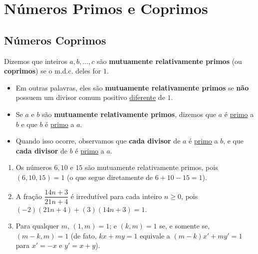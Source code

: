 \section{Números Primos e Coprimos}

    \subsection{Números Coprimos}

        \begin{definicao}[ 5.1. : ]
            Dizemos que inteiros $a, b, \ldots, c$ são \textbf{mutuamente relativamente primos} (ou \textbf{coprimos}) 
            se o m.d.c. deles for $1$.
        \end{definicao}

        \begin{itemize}[left=0.5cm, align=left, nosep]
            \item Em outras palavras, eles são \textbf{mutuamente relativamente primos} se \textbf{não} possuem um divisor comum
            positivo \underline{diferente} de $1$. 
            \item Se $a$ e $b$ são \textbf{mutuamente relativamente primos}, dizemos que $a$ é \underline{primo} a $b$ e que $b$ é \underline{primo} a $a$. 
            \item Quando isso ocorre, observamos que \textbf{cada divisor} de $a$ é \underline{primo} a $b$, e que \textbf{cada divisor} de $b$ é \underline{primo} a $a$.
        \end{itemize}

        \begin{exemplo}
            \begin{enumerate}[left=0.5cm, align=left, nosep]
                \item Os números $6, 10$ e $15$ são mutuamente relativamente primos, pois $(6, 10, 15) = 1$ 
                (o que segue diretamente de $6 + 10 - 15 = 1$).
                
                \item A fração $\dfrac{14n+3}{21n+4}$ é irredutível para cada inteiro $n \ge 0$, 
                pois $(-2)(21n + 4) + (3)(14n + 3) = 1$.
                
                \item Para qualquer $m$, $(1, m) = 1$; e $(k, m) = 1$ se, e somente se, $(m - k, m) = 1$ 
                (de fato, $kx + my = 1$ equivale a $(m-k)x' + my' = 1$ para $x' = -x$ e $y' = x + y$).
            \end{enumerate}
        \end{exemplo}

